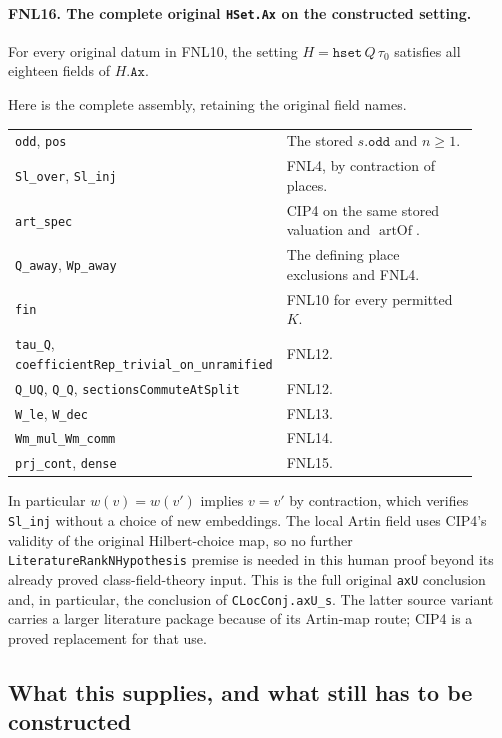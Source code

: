 \paragraph{FNL16. The complete original \texttt{HSet.Ax} on the constructed setting.}
\label{claim:FNL16}
For every original datum in FNL10, the setting
\(H=\texttt{hset}\,Q\,\tau_0\) satisfies all eighteen fields of
\(H.\texttt{Ax}\).

Here is the complete assembly, retaining the original field names.
\begin{center}\small
\begin{tabular}{p{0.43\linewidth}p{0.49\linewidth}}
\texttt{odd}, \texttt{pos} & The stored \(s.\texttt{odd}\) and \(n\ge1\).\\
\texttt{Sl\_over}, \texttt{Sl\_inj} & FNL4, by contraction of places.\\
\texttt{art\_spec} & CIP4 on the same stored valuation and \(\operatorname{artOf}\).\\
\texttt{Q\_away}, \texttt{Wp\_away} & The defining place exclusions and FNL4.\\
\texttt{fin} & FNL10 for every permitted \(K\).\\
\texttt{tau\_Q}, \texttt{coefficientRep\_trivial\_on\_unramified} & FNL12.\\
\texttt{Q\_UQ}, \texttt{Q\_Q}, \texttt{sectionsCommuteAtSplit} & FNL12.\\
\texttt{W\_le}, \texttt{W\_dec} & FNL13.\\
\texttt{Wm\_mul\_Wm\_comm} & FNL14.\\
\texttt{prj\_cont}, \texttt{dense} & FNL15.
\end{tabular}
\end{center}
In particular \(w(v)=w(v')\) implies \(v=v'\) by contraction,
which verifies \texttt{Sl\_inj} without a choice of new embeddings.
The local Artin field uses CIP4's validity of the original Hilbert-choice
map, so no further \texttt{LiteratureRankNHypothesis} premise is needed
in this human proof beyond its already proved class-field-theory input.
This is the full original \texttt{axU} conclusion and, in particular,
the conclusion of \texttt{CLocConj.axU\_s}.  The latter source variant
carries a larger literature package because of its Artin-map route;
CIP4 is a proved replacement for that use.

\subsection{What this supplies, and what still has to be constructed}

